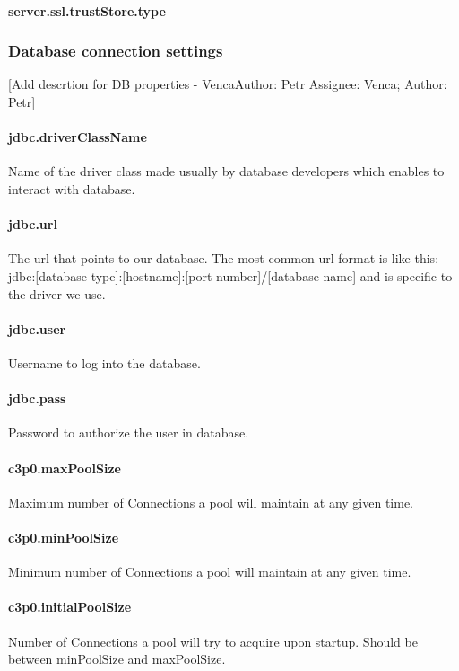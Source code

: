 \documentclass[12pt,a4paper]{report}
\makeatletter
\newcommand{\comment}[3][\@empty]{
  {\color{magenta}[#3 - }
  {\color{green}\ifx\@empty#1\relax Author: #2 \else Assignee: #1; Author: #2\fi}{\color{magenta}]}
}
\makeatother
\begin{document}
\paragraph{server.ssl.trustStore.type}

\subsubsection{Database connection settings}
\comment[Venca]{Petr}{Add descrtion for DB properties}
\paragraph{jdbc.driverClassName}
Name of the driver class made usually by database developers which enables to interact with database.

\paragraph{jdbc.url}
 The url that points to our database. The most common url format is like this:
jdbc:[database type]:[hostname]:[port number]/[database name]
and is specific to the driver we use.

\paragraph{jdbc.user}
Username to log into the database.
\paragraph{jdbc.pass}
Password to authorize the user in database.

\paragraph{c3p0.maxPoolSize}
Maximum number of Connections a pool will maintain at any given time.

\paragraph{c3p0.minPoolSize}
Minimum number of Connections a pool will maintain at any given time.

\paragraph{c3p0.initialPoolSize}
Number of Connections a pool will try to acquire upon startup. Should be between
minPoolSize and maxPoolSize.
\end{document}
